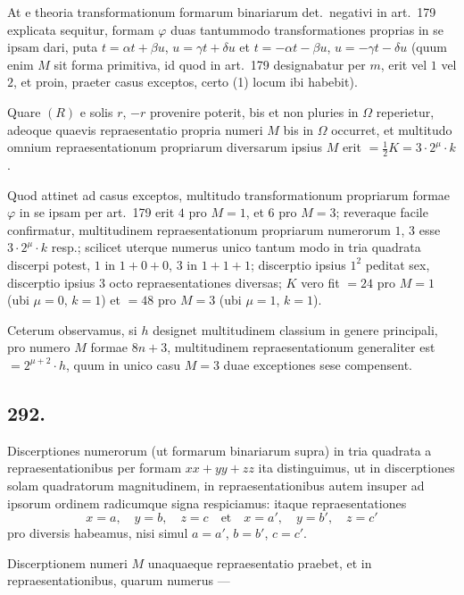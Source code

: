 \documentclass[12pt,a4paper]{article}
\theoremstyle{plain}
\theoremstyle{definition}
\theoremstyle{remark}
\begin{document}
At e theoria transformationum formarum binariarum det.\ negativi in art.\@~179
explicata sequitur, formam $\varphi$ duas tantummodo transformationes proprias in se
ipsam dari, puta $t = \alpha t + \beta u$, $u = \gamma t + \delta u$ et $t = -\alpha t - \beta u$,
$u = -\gamma t - \delta u$ (quum enim $M$ sit forma primitiva, id quod in art.\@~179
designabatur per $m$, erit vel $1$ vel $2$, et proin, praeter casus exceptos, certo
(1) locum ibi habebit).

Quare $(R)$ e solis $r$, $-r$ provenire poterit, bis et non pluries in $\Omega$
reperietur, adeoque quaevis repraesentatio propria numeri $M$ bis in $\Omega$ occurret,
et multitudo omnium repraesentationum propriarum diversarum ipsius $M$ erit
$= \tfrac{1}{2}K = 3 \cdot 2^{\mu} \cdot k$.

Quod attinet ad casus exceptos, multitudo transformationum propriarum formae
$\varphi$ in se ipsam per art.\@~179 erit $4$ pro $M = 1$, et $6$ pro $M = 3$;
reveraque facile confirmatur, multitudinem repraesentationum propriarum
numerorum $1$, $3$ esse $3 \cdot 2^{\mu} \cdot k$ resp.; scilicet uterque numerus unico tantum
modo in tria quadrata discerpi potest, $1$ in $1 + 0 + 0$, $3$ in $1 + 1 + 1$;
discerptio ipsius $1^2$ peditat sex, discerptio ipsius $3$ octo repraesentationes diversas;
$K$ vero fit $= 24$ pro $M = 1$ (ubi $\mu = 0$, $k = 1$) et $= 48$ pro $M = 3$
(ubi $\mu = 1$, $k = 1$).

Ceterum observamus, si $h$ designet multitudinem classium in genere principali,
pro numero $M$ formae $8n + 3$, multitudinem repraesentationum generaliter est
$= 2^{\mu+2} \cdot h$, quum in unico casu $M = 3$ duae exceptiones sese compensent.

\subsection*{292.}

Discerptiones numerorum (ut formarum binariarum supra) in tria quadrata a
repraesentationibus per formam $xx + yy + zz$ ita distinguimus, ut in discerptiones
solam quadratorum magnitudinem, in repraesentationibus autem insuper ad ipsorum
ordinem radicumque signa respiciamus: itaque repraesentationes
\[
x = a, \quad y = b, \quad z = c \quad\text{et}\quad x = a', \quad y = b', \quad z = c'
\]
pro diversis habeamus, nisi simul $a = a'$, $b = b'$, $c = c'$.

Discerptionem numeri $M$ unaquaeque repraesentatio praebet, et in
repraesentationibus, quarum numerus ---
\end{document}
